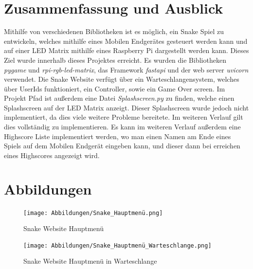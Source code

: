 \documentclass[a4paper,12pt]{scrartcl}
\begin{document}
\section{Zusammenfassung und Ausblick}
Mithilfe von verschiedenen Bibliotheken ist es möglich, ein Snake Spiel zu entwickeln, welches mithilfe eines Mobilen Endgerätes gesteuert werden kann und auf einer LED Matrix mithilfe eines Raspberry Pi dargestellt werden kann. Dieses Ziel wurde innerhalb dieses Projektes erreicht. Es wurden die Bibliotheken \textit{pygame} und \textit{rpi-rgb-led-matrix}, das Framework \textit{fastapi} und der web server \textit{uvicorn} verwendet. Die Snake Website verfügt über ein Warteschlangensystem, welches über UserIds funktioniert, ein Controller, sowie ein Game Over screen. Im Projekt Pfad ist außerdem eine Datei \textit{Splashscreen.py} zu finden, welche einen Splashscreen auf der LED Matrix anzeigt. Dieser Splashscreen wurde jedoch nicht implementiert, da dies viele weitere Probleme bereitete. Im weiteren Verlauf gilt dies vollständig zu implementieren. Es kann im weiteren Verlauf außerdem eine Highscore Liste implementiert werden, wo man einen Namen am Ende eines Spiels auf dem Mobilen Endgerät eingeben kann, und dieser dann bei erreichen eines Highscores angezeigt wird.

\newpage
\section{Abbildungen}

\begin{figure}[!h]
   \begin{minipage}[t]{.4\linewidth}
      \texttt{[image: Abbildungen/Snake\_Hauptmenü.png]}
      \caption{Snake Website Hauptmenü}
      \label{fig:main-menu}
   \end{minipage}
   \hspace{.1\linewidth}%
   \begin{minipage}[t]{.4\linewidth}
      \texttt{[image: Abbildungen/Snake\_Hauptmenü\_Warteschlange.png]}
      \caption{Snake Website Hauptmenü in Warteschlange}
      \label{fig:main-menu-queue}
   \end{minipage}
\end{figure}
\end{document}
